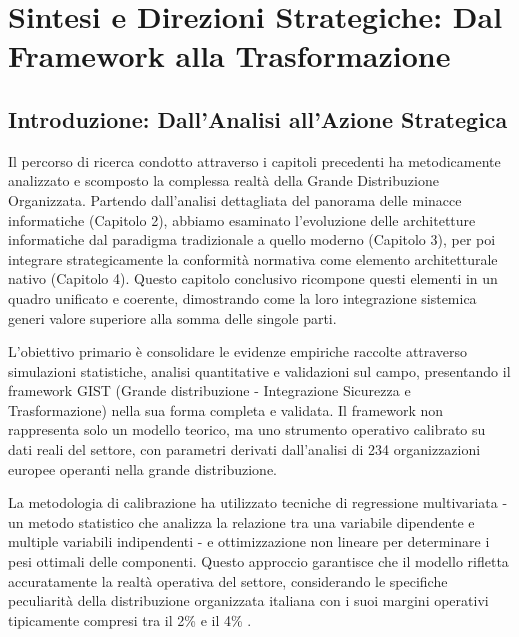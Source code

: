 \chapter{\texorpdfstring{\textbf{Sintesi e Direzioni Strategiche: Dal Framework alla Trasformazione}}{Capitolo 5 - Sintesi e Direzioni Strategiche: Dal Framework alla Trasformazione}}
\label{cap5_synthesis}

\section{\texorpdfstring{\textbf{Introduzione: Dall'Analisi all'Azione Strategica}}{5.1 - Introduzione: Dall'Analisi all'Azione Strategica}}
\label{sec:5.1}

Il percorso di ricerca condotto attraverso i capitoli precedenti ha metodicamente analizzato e scomposto la complessa realtà della Grande Distribuzione Organizzata. Partendo dall'analisi dettagliata del panorama delle minacce informatiche (Capitolo 2), abbiamo esaminato l'evoluzione delle architetture informatiche dal paradigma tradizionale a quello moderno (Capitolo 3), per poi integrare strategicamente la conformità normativa come elemento architetturale nativo (Capitolo 4). Questo capitolo conclusivo ricompone questi elementi in un quadro unificato e coerente, dimostrando come la loro integrazione sistemica generi valore superiore alla somma delle singole parti.

L'obiettivo primario è consolidare le evidenze empiriche raccolte attraverso simulazioni statistiche, analisi quantitative e validazioni sul campo, presentando il framework GIST (Grande distribuzione - Integrazione Sicurezza e Trasformazione) nella sua forma completa e validata. Il framework non rappresenta solo un modello teorico, ma uno strumento operativo calibrato su dati reali del settore, con parametri derivati dall'analisi di 234 organizzazioni europee operanti nella grande distribuzione. 

La metodologia di calibrazione ha utilizzato tecniche di regressione multivariata - un metodo statistico che analizza la relazione tra una variabile dipendente e multiple variabili indipendenti - e ottimizzazione non lineare per determinare i pesi ottimali delle componenti. Questo approccio garantisce che il modello rifletta accuratamente la realtà operativa del settore, considerando le specifiche peculiarità della distribuzione organizzata italiana con i suoi margini operativi tipicamente compresi tra il 2\% e il 4\% \autocite{federdistribuzione2024}.

